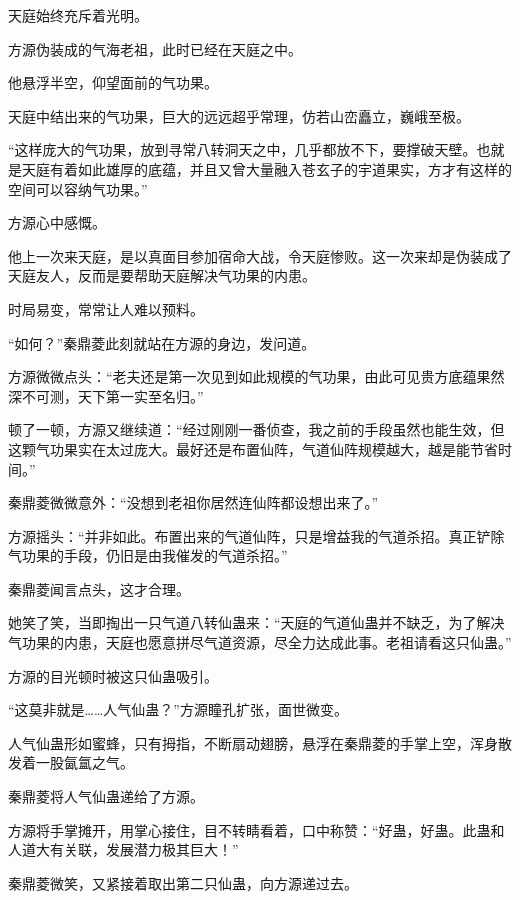 
\begin{this_body}

天庭始终充斥着光明。

方源伪装成的气海老祖，此时已经在天庭之中。

他悬浮半空，仰望面前的气功果。

天庭中结出来的气功果，巨大的远远超乎常理，仿若山峦矗立，巍峨至极。

“这样庞大的气功果，放到寻常八转洞天之中，几乎都放不下，要撑破天壁。也就是天庭有着如此雄厚的底蕴，并且又曾大量融入苍玄子的宇道果实，方才有这样的空间可以容纳气功果。”

方源心中感慨。

他上一次来天庭，是以真面目参加宿命大战，令天庭惨败。这一次来却是伪装成了天庭友人，反而是要帮助天庭解决气功果的内患。

时局易变，常常让人难以预料。

“如何？”秦鼎菱此刻就站在方源的身边，发问道。

方源微微点头：“老夫还是第一次见到如此规模的气功果，由此可见贵方底蕴果然深不可测，天下第一实至名归。”

顿了一顿，方源又继续道：“经过刚刚一番侦查，我之前的手段虽然也能生效，但这颗气功果实在太过庞大。最好还是布置仙阵，气道仙阵规模越大，越是能节省时间。”

秦鼎菱微微意外：“没想到老祖你居然连仙阵都设想出来了。”

方源摇头：“并非如此。布置出来的气道仙阵，只是增益我的气道杀招。真正铲除气功果的手段，仍旧是由我催发的气道杀招。”

秦鼎菱闻言点头，这才合理。

她笑了笑，当即掏出一只气道八转仙蛊来：“天庭的气道仙蛊并不缺乏，为了解决气功果的内患，天庭也愿意拼尽气道资源，尽全力达成此事。老祖请看这只仙蛊。”

方源的目光顿时被这只仙蛊吸引。

“这莫非就是……人气仙蛊？”方源瞳孔扩张，面世微变。

人气仙蛊形如蜜蜂，只有拇指，不断扇动翅膀，悬浮在秦鼎菱的手掌上空，浑身散发着一股氤氲之气。

秦鼎菱将人气仙蛊递给了方源。

方源将手掌摊开，用掌心接住，目不转睛看着，口中称赞：“好蛊，好蛊。此蛊和人道大有关联，发展潜力极其巨大！”

秦鼎菱微笑，又紧接着取出第二只仙蛊，向方源递过去。


\end{this_body}
